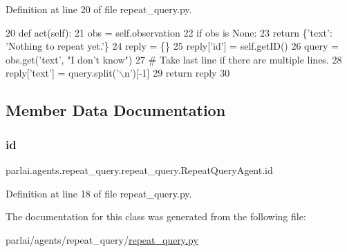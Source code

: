 Definition at line 20 of file repeat\+\_\+query.\+py.


\begin{DoxyCode}
20     \textcolor{keyword}{def }act(self):
21         obs = self.observation
22         \textcolor{keywordflow}{if} obs \textcolor{keywordflow}{is} \textcolor{keywordtype}{None}:
23             \textcolor{keywordflow}{return} \{\textcolor{stringliteral}{'text'}: \textcolor{stringliteral}{'Nothing to repeat yet.'}\}
24         reply = \{\}
25         reply[\textcolor{stringliteral}{'id'}] = self.getID()
26         query = obs.get(\textcolor{stringliteral}{'text'}, \textcolor{stringliteral}{"I don't know"})
27         \textcolor{comment}{# Take last line if there are multiple lines.}
28         reply[\textcolor{stringliteral}{'text'}] = query.split(\textcolor{stringliteral}{'\(\backslash\)n'})[-1]
29         \textcolor{keywordflow}{return} reply
30 \end{DoxyCode}


\subsection{Member Data Documentation}
\mbox{\label{classparlai_1_1agents_1_1repeat__query_1_1repeat__query_1_1RepeatQueryAgent_ab6fbd1dbd2b197d0ab72d3f9f11c9d8a}} 
\subsubsection{\texorpdfstring{id}{id}}
{\footnotesize\ttfamily parlai.\+agents.\+repeat\+\_\+query.\+repeat\+\_\+query.\+Repeat\+Query\+Agent.\+id}



Definition at line 18 of file repeat\+\_\+query.\+py.



The documentation for this class was generated from the following file\+:\begin{DoxyCompactItemize}
\item 
parlai/agents/repeat\+\_\+query/\hyperlink{repeat__query_8py}{repeat\+\_\+query.\+py}\end{DoxyCompactItemize}
